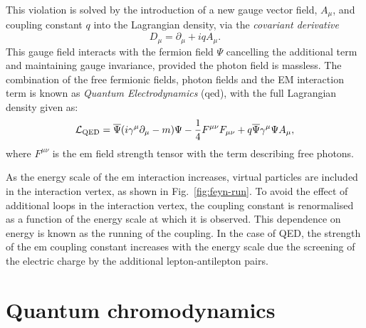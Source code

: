 This violation is solved by the introduction of a new gauge vector field, $A_{\mu}$, and coupling constant $q$ into the Lagrangian density, via the \textit{covariant derivative}
\begin{equation}
D_{\mu} = \partial_{\mu}+iqA_{\mu}.
\end{equation}
This gauge field interacts with the fermion field $\Psi$ cancelling the additional term and maintaining gauge invariance, provided the photon field is massless.
The combination of the free fermionic fields, photon fields and the EM interaction term is known as \textit{Quantum Electrodynamics} (\acrshort{qed}), with the full Lagrangian density given as:
\begin{equation}
\mathcal{L}_{\mathrm{QED}}=\overline{\Psi}(i\gamma^{\mu}\partial_{\mu}-m)\Psi - \frac{1}{4}F^{\mu \nu }F_{\mu \nu } + q\overline{\Psi}\gamma^{\mu}\Psi A_{\mu},
\end{equation}
where $F^{\mu \nu}$ is the \acrshort{em} field strength tensor with the term describing free photons.

As the energy scale of the \acrshort{em} interaction increases, virtual particles are included in the interaction vertex, as shown in Fig.~\ref{fig:feyn-run}.
To avoid the effect of additional loops in the interaction vertex, the coupling constant is renormalised as a function of the energy scale at which it is observed.
This dependence on energy is known as the running of the coupling.
In the case of \acrshort{QED}, the strength of the \acrshort{em} coupling constant increases with the energy scale due the screening of the electric charge by the additional lepton-antilepton pairs.


\section{Quantum chromodynamics}
\label{sec:QCD}

